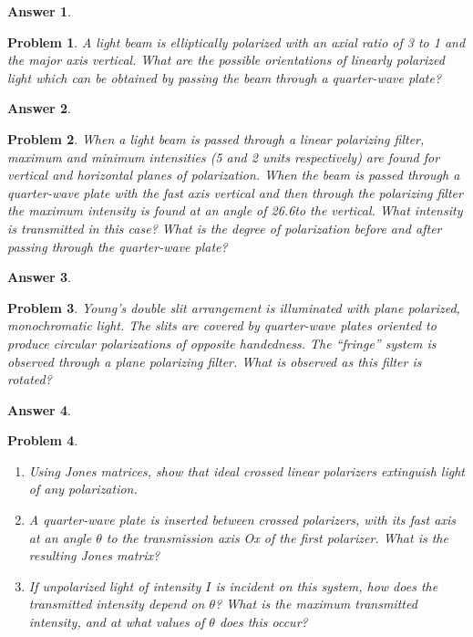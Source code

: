 \documentclass[a4paper]{article}
\newtheorem{ans}{Answer}[section]
\theoremstyle{new}
\newtheorem{qns}{Problem}[section]
\begin{document}
\begin{ans}

\end{ans}
\begin{qns}
A light beam is elliptically polarized with an axial ratio of 3 to 1 and the major axis vertical. What are the possible orientations of linearly polarized light which can be obtained by passing the beam through a quarter-wave plate?
\end{qns}
\begin{ans}

\end{ans}
\newpage
\begin{qns}
When a light beam is passed through a linear polarizing filter, maximum and minimum intensities (5 and 2 units respectively) are found for vertical and horizontal planes of polarization. When the beam is passed through a quarter-wave plate with the fast axis vertical and then through the polarizing filter the maximum intensity is found at an angle of 26.6\degree to the vertical. What intensity is transmitted in this case? What is the degree of polarization before and after passing through the quarter-wave plate?
\end{qns}
\begin{ans}

\end{ans}
\begin{qns}
Young’s double slit arrangement is illuminated with plane polarized, monochromatic light. The slits are covered by quarter-wave plates oriented to produce circular polarizations of opposite handedness. The “fringe” system is observed through a plane polarizing filter. What is observed as this filter is rotated?
\end{qns}
\begin{ans}

\end{ans}
\begin{qns}\leavevmode
\begin{enumerate}[label=(\alph*)]
\item Using Jones matrices, show that ideal crossed linear polarizers extinguish light of any polarization.
\item A quarter-wave plate is inserted between crossed polarizers, with its fast axis at an angle $\theta$ to the transmission axis Ox of the first polarizer. What is the resulting Jones matrix?
\item If unpolarized light of intensity $I$ is incident on this system, how does the transmitted intensity depend on $\theta$? What is the maximum transmitted intensity, and at what values of $\theta$ does this occur?
\end{enumerate}
\end{qns}
\end{document}
